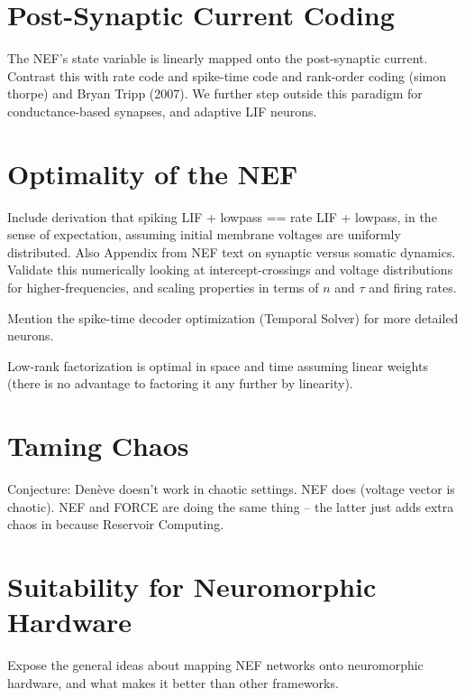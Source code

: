\section{Post-Synaptic Current Coding}

The NEF's state variable is linearly mapped onto the post-synaptic current.
Contrast this with rate code and spike-time code and rank-order coding (simon thorpe) and Bryan Tripp (2007).
We further step outside this paradigm for conductance-based synapses, and adaptive LIF neurons.


\section{Optimality of the NEF}

Include derivation that spiking LIF + lowpass == rate LIF + lowpass, in the sense of expectation, assuming initial membrane voltages are uniformly distributed.
Also Appendix from NEF text on synaptic versus somatic dynamics.
Validate this numerically looking at intercept-crossings and voltage distributions for higher-frequencies, and scaling properties in terms of $n$ and $\tau$ and firing rates.

Mention the spike-time decoder optimization (Temporal Solver) for more detailed neurons.

Low-rank factorization is optimal in space and time assuming linear weights (there is no advantage to factoring it any further by linearity).


\section{Taming Chaos}

Conjecture: Den\`eve doesn't work in chaotic settings. NEF does (voltage vector is chaotic). NEF and FORCE are doing the same thing -- the latter just adds extra chaos in because Reservoir Computing.


\section{Suitability for Neuromorphic Hardware}

Expose the general ideas about mapping NEF networks onto neuromorphic hardware, and what makes it better than other frameworks.

